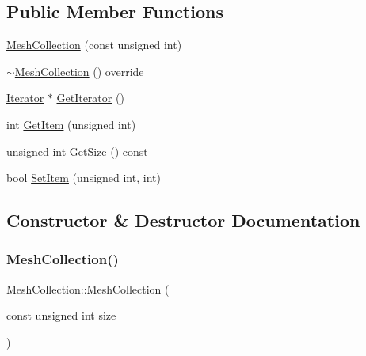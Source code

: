 \subsection*{Public Member Functions}
\begin{DoxyCompactItemize}
\item 
\mbox{\hyperlink{class_mesh_collection_a4265f78f2b6a91d992ecd43f4ec8cb4e}{Mesh\+Collection}} (const unsigned int)
\item 
\mbox{\hyperlink{class_mesh_collection_a98fcc70b7b34b7b3d6b34e45eb92d98c}{$\sim$\+Mesh\+Collection}} () override
\item 
\mbox{\hyperlink{class_iterator}{Iterator}} $\ast$ \mbox{\hyperlink{class_mesh_collection_ac0a6c3c91ed15c06292d5e659f8259ae}{Get\+Iterator}} ()
\item 
int \mbox{\hyperlink{class_mesh_collection_a7e13df76bc1c8f2d68b7b023a0236eab}{Get\+Item}} (unsigned int)
\item 
unsigned int \mbox{\hyperlink{class_mesh_collection_a8bf6eaca8ec989b7a87919b5fa38fa5c}{Get\+Size}} () const
\item 
bool \mbox{\hyperlink{class_mesh_collection_a1560794edf29c2113e237946ebfa9c51}{Set\+Item}} (unsigned int, int)
\end{DoxyCompactItemize}


\subsection{Constructor \& Destructor Documentation}
\mbox{\label{class_mesh_collection_a4265f78f2b6a91d992ecd43f4ec8cb4e}} 
\subsubsection{\texorpdfstring{MeshCollection()}{MeshCollection()}}
{\footnotesize\ttfamily Mesh\+Collection\+::\+Mesh\+Collection (\begin{DoxyParamCaption}\item[{const unsigned int}]{size }\end{DoxyParamCaption})\hspace{0.3cm}{\ttfamily [explicit]}}

\mbox{\label{class_mesh_collection_a98fcc70b7b34b7b3d6b34e45eb92d98c}} 
